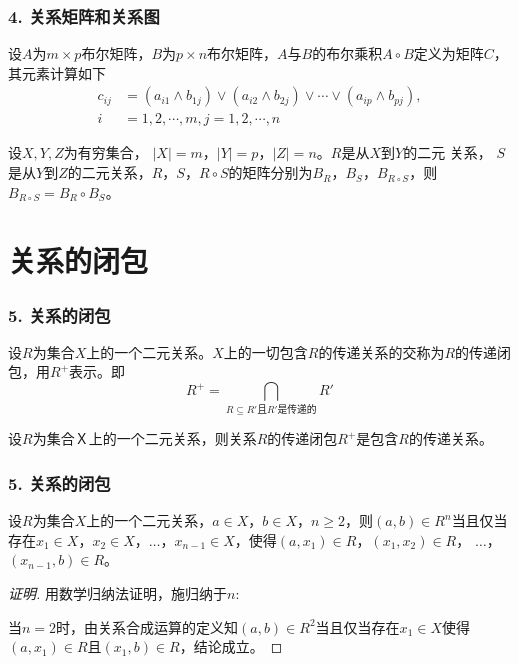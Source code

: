\documentclass{beamer}
\begin{document}
\begin{CJK*}{UTF8}{gbsn}
\begin{frame}
  \frametitle{4. 关系矩阵和关系图}
  \begin{Def}
    设$A$为$m\times p$布尔矩阵，$B$为$p \times n$布尔矩阵，$A$与$B$的布尔乘积$A \circ B$定义为矩阵$C$，其元素计算如下
    \begin{align*}
      c_{ij} &= (a_{i1}\land b_{1j}) \lor (a_{i2} \land b_{2j}) \lor \cdots \lor (a_{ip} \land b_{pj}), \\
      i &= 1,2,\cdots, m, j = 1,2,\cdots, n
    \end{align*}
  \end{Def}\pause
  \begin{Thm}
    设$X, Y, Z$为有穷集合， $|X| =m$，$|Y|=p$，$|Z| = n$。$R$是从$X$到$Y$的二元
    关系， $S$是从$Y$到$Z$的二元关系，$R$，$S$，$R \circ S$的矩阵分别为$B_{R}$，$B_{S}$，$B_{R\circ S}$，则$B_{R\circ S} = B_R \circ B_S$。
  \end{Thm}
\end{frame}

\section{关系的闭包}
\begin{frame}
  \frametitle{5. 关系的闭包}
  \begin{Def}
    设$R$为集合$X$上的一个二元关系。$X$上的一切包含$R$的传递关系的交称为$R$的传递闭包，用$R^+$表示。即
    \begin{equation*}
      R^+ = \bigcap_{R \subseteq R' \text{且} R'\text{是传递的}}R'
    \end{equation*}
  \end{Def}
  \pause
  \begin{Thm}
    设$R$为集合Ｘ上的一个二元关系，则关系$R$的传递闭包$R^+$是包含$R$的传递关系。
  \end{Thm}
\end{frame}
\begin{frame}
  \frametitle{5. 关系的闭包}
  \begin{Thm}
    设$R$为集合$X$上的一个二元关系，$a \in X$，$b \in X$，$n \geq 2$，则$(a,b) \in R^n$当且仅当存在$x_1\in X$，$x_2\in X$，$\ldots$，$x_{n-1}\in X$，使得$(a, x_1) \in R$，$(x_1, x_2)\in R$，  $\ldots$， $(x_{n-1}, b)\in R$。
  \end{Thm}
  \begin{proof}[证明]
  \pause 用数学归纳法证明，施归纳于$n$:

  \pause 当$n=2$时，由关系合成运算的定义知$(a,b)\in R^2$当且仅当存在$x_1\in X$使得$(a,x_1)\in R$且$(x_1, b)\in R$，结论成立。


\end{proof}
\end{frame}
\end{CJK*}
\end{document}
